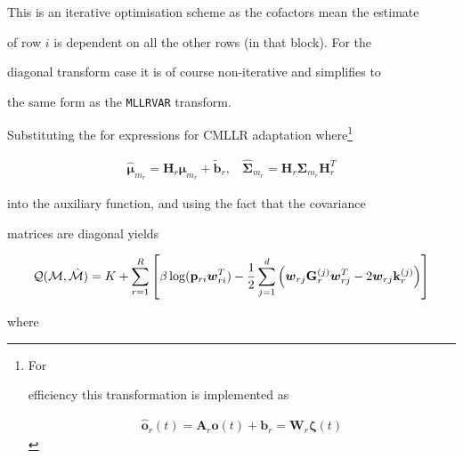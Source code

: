 This is an iterative optimisation scheme as the cofactors mean the estimate


of row $i$ is dependent on all the other rows (in that block). For the 


diagonal transform case it is of course non-iterative and simplifies to


the same form as the {\tt MLLRVAR} transform.










Substituting the for expressions for CMLLR adaptation where\footnote{For


efficiency this transformation is implemented as


\begin{eqnarray}


\hat{\bm o}_r(t) = \bm{A}_r\bm{o}(t) + \bm{b}_r = \bm{W}_r\bm{\zeta}(t)


\end{eqnarray}


}


\begin{eqnarray}


\hat{\bm{\mu}}_{m_r} = \bm{H}_r\bm{\mu}_{m_r} + \tilde{\bm{b}}_r, \:\:\:\: 


\hat{\bm{\Sigma}}_{m_r} = {\bm H}_r{\bm{\Sigma}}_{m_r}{\bm H}_r^T


\end{eqnarray}


into the auxiliary function, and using the fact that the covariance


matrices are diagonal yields


\begin{eqnarray}


{\cal Q}({\cal M},{\hat{\cal M}}) = K + 


\sum_{r=1}^R\left[


\beta\log({\bf p}_{ri}\bm{w}_{ri}^T)-


\frac{1}{2}


\sum_{j=1}^d{


\left(\bm{w}_{rj}{\bf G}^{(j)}_r\bm{w}^T_{rj} - 2\bm{w}_{rj}{\bf k}^{(j)}_r


\right)}\right] \nonumber


\end{eqnarray}


where 



